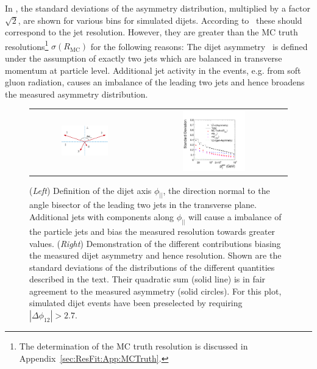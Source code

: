 In , the standard deviations of
the asymmetry distribution, multiplied by a factor $\sqrt{2}$,
are shown for various \ptgen bins for simulated dijets.
According to~ these should correspond to the
jet \pt resolution.
However, they are greater than the MC truth resolutions\footnote{The
  determination of the MC truth resolution is discussed in
  Appendix~\ref{sec:ResFit:App:MCTruth}.} $\sigma(R_{\text{MC}})$ for
the following reasons:
The dijet asymmetry~ is defined under the assumption of exactly two jets which are balanced in transverse momentum at particle level.
Additional jet activity in the events, e.g. from soft gluon
radiation, causes an imbalance of the leading two jets and hence
broadens the measured asymmetry distribution.

\begin{figure}[ht]
 \centering
  \begin{tabular}{cc}
    \includegraphics[width=0.45\textwidth]{figures/Sketch_Projections} &
    \includegraphics[width=0.45\textwidth]{figures/Spring10QCDDiJet_ParallelComponent_hParallelContributions} \\
 \end{tabular}
  \caption{(\textit{Left}) Definition of the dijet axis $\phi_{||}$, the direction normal to the
    angle bisector of the leading two jets in the transverse plane.
    Additional jets with \pt components along $\phi_{||}$ will cause
    a \pt imbalance of the particle jets and bias the measured
    resolution towards greater values. 
    (\textit{Right}) Demonstration of the different
    contributions biasing the measured dijet asymmetry and hence resolution.
    Shown are the standard deviations of the distributions of the
    different quantities described in the text. 
    Their quadratic sum (solid line) is in fair agreement to the
    measured asymmetry (solid circles).
    For this plot, simulated dijet events have been preselected by requiring \mbox{$|\Delta\phi_{12}| > 2.7$}.
 }
  \label{fig:ResFit:DataDriven:AddJets:Bias}
\end{figure}

